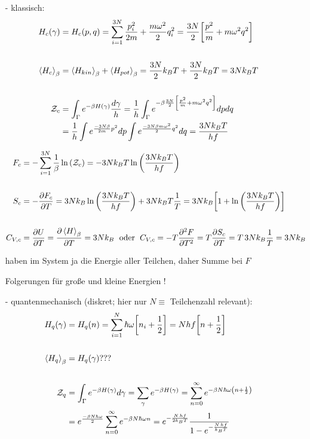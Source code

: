 \begin{itemize}
\item[-] klassisch:
\begin{align*}\label{key}
H_c(\gamma) &= H_c(p,q) = \sum\limits_{i=1}^{3N} \frac{p_i^2}{2m} + \frac{m\omega^2}{2}q_i^2 = \frac{3N}{2} \qty[\frac{p^2}{m} + m\omega^2q^2]%
\\\\
\expval{H_c}_\beta &= \expval{H_{kin}}_\beta + \expval{H_{pot}}_\beta = \frac{3N}{2} k_B T + \frac{3N}{2} k_B T = 3 N k_B T
\\\\
\mathcal{Z}_c &= \int_\Gamma e^{-\beta H(\gamma)} \frac{d\gamma}{h} = \frac{1}{h} \int_\Gamma e^{-\beta \frac{3N}{2} \qty[\frac{p^2}{m} + m\omega^2 q^2]} dp dq
\\
&= \frac{1}{h} \int e^{\frac{-3N\beta}{2m} p^2} dp \int e^{\frac{-3N\beta m\omega^2}{2} q^2} dq = \frac{3 N k_B T}{h f}
\end{align*}

\begin{align*}
F_c &= -\sum\limits_{i=1}^{3N} \frac{1}{\beta} \ln\qty(\mathcal{Z}_c) = - 3N k_B T \ln\qty(\frac{3 N k_B T}{h f})
\\\\
S_c &= -\pdv{F_c}{T} = 3N k_B \ln\qty(\frac{3 N k_B T}{h f}) + 3N k_B T \frac{1}{T} = 3N k_B \qty[1 + \ln\qty(\frac{3 N k_B T}{h f})]
\\\\
C_{V, c} &= \pdv{U}{T} = \pdv{\expval{H}_\beta}{T} = 3 N k_B \; \text{ oder } \; C_{V, c} = -T \pdv[2]{F}{T} = T \pdv{S_c}{T} = T \,3N  k_B \frac{1}{T} = 3N k_B
\end{align*}

haben im System ja die Energie aller Teilchen, daher Summe bei $F$

Folgerungen für große und kleine Energien !


\item[-] quantenmechanisch (diskret; hier nur $N \equiv$ Teilchenzahl relevant):
\begin{align*}
H_q(\gamma) &= H_q(n) = \sum\limits_{i=1}^N \hbar\omega \qty[n_i+\frac{1}{2}] = N h f \qty[n+\frac{1}{2}]
\\\\
\expval{H_q}_\beta &= H_q(\gamma) ???
\\\\
\mathcal{Z}_q &= \int_\Gamma e^{-\beta H(\gamma)} d\gamma = \sum\limits_\gamma e^{-\beta H(\gamma)} = \sum\limits_{n=0}^\infty e^{-\beta N\hbar\omega \qty(n+\frac{1}{2})}
\\
&= e^{\frac{-\beta N\hbar\omega}{2}} \sum\limits_{n=0}^\infty e^{-\beta N\hbar\omega n} = e^{-\frac{N \, h f}{2 k_B T}} \frac{1}{1-e^{-\frac{N \, h f}{k_B T}}}
\end{align*}


\end{itemize}
